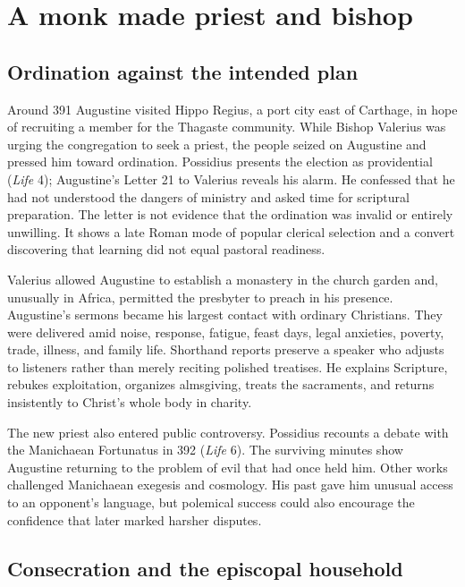 \section{A monk made priest and bishop}\label{sec:aug-bishop}

\subsection{Ordination against the intended plan}

Around 391 Augustine visited Hippo Regius, a port city east of Carthage, in
hope of recruiting a member for the Thagaste community. While Bishop Valerius
was urging the congregation to seek a priest, the people seized on Augustine
and pressed him toward ordination. Possidius presents the election as
providential (\emph{Life} 4); Augustine's Letter 21 to Valerius reveals his
alarm. He confessed that he had not understood the dangers of ministry and
asked time for scriptural preparation. The letter is not evidence that the
ordination was invalid or entirely unwilling. It shows a late Roman mode of
popular clerical selection and a convert discovering that learning did not
equal pastoral readiness.

Valerius allowed Augustine to establish a monastery in the church garden and,
unusually in Africa, permitted the presbyter to preach in his presence.
Augustine's sermons became his largest contact with ordinary Christians. They
were delivered amid noise, response, fatigue, feast days, legal anxieties,
poverty, trade, illness, and family life. Shorthand reports preserve a speaker
who adjusts to listeners rather than merely reciting polished treatises. He
explains Scripture, rebukes exploitation, organizes almsgiving, treats the
sacraments, and returns insistently to Christ's whole body in charity.

The new priest also entered public controversy. Possidius recounts a debate
with the Manichaean Fortunatus in 392 (\emph{Life} 6). The surviving minutes
show Augustine returning to the problem of evil that had once held him. Other
works challenged Manichaean exegesis and cosmology. His past gave him unusual
access to an opponent's language, but polemical success could also encourage
the confidence that later marked harsher disputes.

\subsection{Consecration and the episcopal household}

